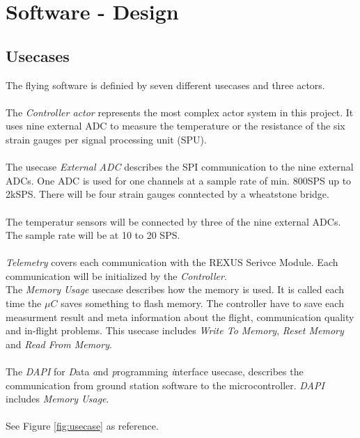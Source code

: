 \section{Software - Design}
\subsection{Usecases}
The flying software is definied by seven different usecases and three actors. \\ \\
The \textit{Controller actor} represents the most complex actor system in this project. It uses nine external ADC to measure the temperature or the resistance of the six strain gauges per signal processing unit (SPU). \\ \\ 
The usecase \textit{External ADC} describes the SPI communication to the nine external ADCs. One ADC is used for one channels at a sample rate of min. 800SPS up to 2kSPS. There will be four strain gauges conntected by a wheatstone bridge.\\ \\
The temperatur sensors will be connected by three of the  nine external ADCs. The sample rate will be at 10 to 20 SPS. \\ \\
\textit{Telemetry} covers each communication with the REXUS Serivce Module. Each communication will be initialized by the \textit{Controller}.\\ 
The \textit{Memory Usage} usecase describes how the memory is used. It is called each time the $\mu C$ saves something to flash memory. The controller have to save each measurment result and meta information about the flight, communication quality and in-flight problems. This usecase includes \textit{Write To Memory}, \textit{Reset Memory} and \textit{Read From Memory}. \\ \\
The \textit{DAPI} for \textit{D}ata \textit{a}nd \textit{p}rogramming  \textit{i}nterface usecase, describes the communication from ground station software to the microcontroller. \textit{DAPI} includes \textit{Memory Usage}.\\ \\
See Figure \ref{fig:usecase} as reference. 
\pagebreak
